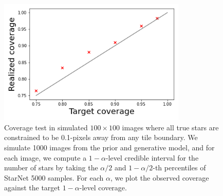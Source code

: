 \begin{figure}[tb]
    \centering
    \includegraphics[width=0.8\textwidth]{./figures/coverage/good_coverage.png}
    \vspace{-0.4cm}
    \caption{Coverage test in simulated $100\times100$ images where all true stars are constrained to be 0.1-pixels away from any tile
    boundary.
    We simulate 1000 images from the prior and generative model, and for each image, we compute a $1 - \alpha$-level credible
    interval for the number of stars by taking the $\alpha/2$ and $1 -\alpha/2$-th percentiles of StarNet 5000 samples.
    For each $\alpha$, we plot the observed coverage against the target $1 - \alpha$-level coverage. }
    \label{fig:coverage_good}
\end{figure}
